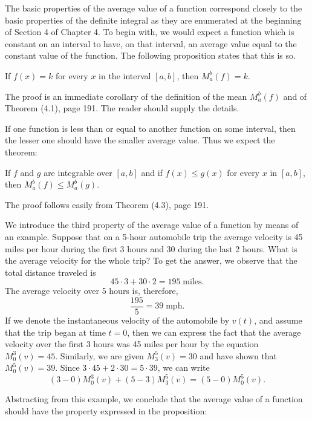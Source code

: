 \begin{example}
The basic properties of the average value of a function correspond closely to the basic properties of the definite integral as they are enumerated at the beginning of Section 4 of Chapter 4. To begin with, we would expect a function which is constant on an interval to have, on that interval, an average value equal to the constant value of the function. The following proposition states that this is so.
\end{example}

\begin{theorem} %
If $f(x) = k$ for every $x$ in the interval $[a, b]$, then $M_a^b (f) = k$.
\end{theorem}

The proof is an immediate corollary of the definition of the mean $M_a^b (f)$ and of Theorem (4.1), page 191. The reader should supply the details.

If one function is less than or equal to another function on some interval, then the lesser one should have the smaller average value. Thus we expect the theorem:

\begin{theorem} %
If $f$ and $g$ are integrable over $[a, b]$ and if $f (x) \leq g(x)$ for every $x$ in $[a, b]$, then $M_a^b (f) \leq M_a^b (g)$.
\end{theorem}

The proof follows easily from Theorem (4.3), page 191.

We introduce the third property of the average value of a function by means of an example. Suppose that on a 5-hour automobile trip the average velocity is 45 miles per hour during the first 3 hours and 30 during the last 2 hours. What is the average velocity for the whole trip? To get the answer, we observe that the total distance traveled is
$$
45 \cdot 3 + 30 \cdot 2 = 195 \;\mbox{miles.}
$$
The average velocity over 5 hours is, therefore,
$$
\frac{195}{5} = 39 \;\mbox{mph.}
$$
If we denote the instantaneous velocity of the automobile by $v(t)$, and assume that the trip began at time $t = 0$, then we can express the fact that the average velocity over the first 3 hours was 45 miles per hour by the equation $M_0^3(v) = 45$. Similarly, we are given $M_3^5(v) = 30$ and have shown that $M_0^5(v) = 39$. Since $3 \cdot 45 + 2 \cdot 30 = 5 \cdot 39$, we can write
$$
(3 - 0)M_0^3(v) + (5 - 3)M_3^5(v) = (5 - 0)M_0^5(v).
$$

Abstracting from this example, we conclude that the average value of a function should have the property expressed in the proposition:

